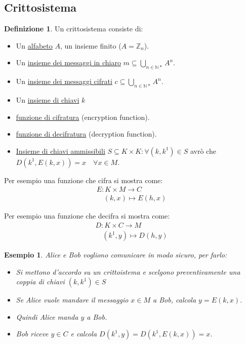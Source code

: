 \documentclass{article}
\newtheorem{exmp}{Esempio}[section]
\theoremstyle{definition}
\newtheorem{definition}{Definizione}[section]
\begin{document}
\subsection{Crittosistema}\label{sec:crittografia}
\begin{definition}
        Un crittosistema consiste di:
        \begin{itemize}
                \item Un \underline{alfabeto} $A$, un insieme finito ($A = \mathbb{Z}_n$).
                \item Un \underline{insieme dei messaggi in chiaro} $m \subseteq \bigcup_{n \in \mathbb{N}*}A^n$.
                \item Un \underline{insieme dei messaggi cifrati} $c \subseteq \bigcup_{n \in \mathbb{N}*}A^n$.
                \item Un \underline{insieme di chiavi} $k$
                \item \underline{funzione di cifratura} (encryption function).
                \item \underline{funzione di decifratura} (decryption function).
                \item \underline{Insieme di chiavi ammissibili} $S \subseteq K \times K : \forall(k,k^1) \in S$ avrò che \newline $D(k^1, E(k,x)) = x \quad \forall x \in M$. 
        \end{itemize}

        Per esempio una funzione che cifra si mostra come:
        \begin{align*}
                E : K \times M \to C \\
                \quad (k,x) \mapsto E(h,x)
        \end{align*}
        
        Per esempio una funzione che decifra si mostra come:
        \begin{align*}
                D : K \times C \to M \\
                \quad (k^1,y) \mapsto D(h,y)
        \end{align*}
\end{definition}

\begin{exmp}
       Alice e Bob vogliono comunicare in modo sicuro, per farlo:
       \begin{itemize}
               \item Si mettono d'accordo su un crittoistema e scelgono preventivamente una coppia di chiavi $(k, k^1) \in S$
               \item Se Alice vuole mandare il messaggio $x \in M$ a Bob, calcola $y = E(k,x)$.
               \item Quindi Alice manda $y$ a Bob.
               \item Bob riceve $y \in C$ e calcola $D(k^1,y)= D(k^1, E(k,x)) = x$.
       \end{itemize}
\end{exmp}
\end{document}
